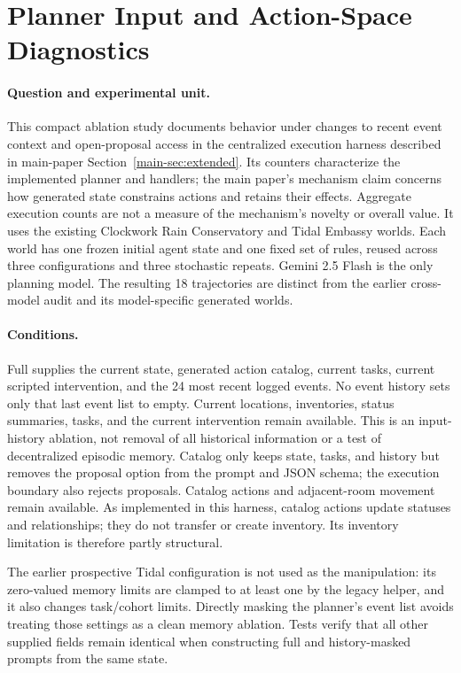 \section{Planner Input and Action-Space Diagnostics}
\label{app:ablation}

\paragraph{Question and experimental unit.}
This compact ablation study documents behavior under changes to recent event
context and open-proposal access in the centralized execution harness described
in main-paper Section~\ref{main-sec:extended}. Its counters characterize the
implemented planner and handlers; the main paper's mechanism claim concerns
how generated state constrains actions and retains their effects. Aggregate
execution counts are not a measure of the mechanism's novelty or overall value. It uses the existing Clockwork Rain
Conservatory and Tidal Embassy worlds. Each world has one frozen initial agent
state and one fixed set of rules, reused across three configurations and three
stochastic repeats. Gemini 2.5 Flash is the only planning model. The resulting
18 trajectories are distinct from the earlier cross-model audit and its
model-specific generated worlds.

\paragraph{Conditions.}
Full supplies the current state, generated action catalog, current tasks,
current scripted intervention, and the 24 most recent logged events.
No event history sets only that last event list to empty. Current locations,
inventories, status summaries, tasks, and the current intervention remain
available. This is an input-history ablation, not removal of all historical
information or a test of decentralized episodic memory. Catalog only keeps
state, tasks, and history but removes the proposal option from the prompt and
JSON schema; the execution boundary also rejects proposals. Catalog actions
and adjacent-room movement remain available. As implemented in this harness,
catalog actions update statuses and relationships; they do not transfer or
create inventory. Its inventory limitation is therefore partly structural.

The earlier prospective Tidal configuration is not used as the manipulation:
its zero-valued memory limits are clamped to at least one by the legacy helper,
and it also changes task/cohort limits. Directly masking the planner's event
list avoids treating those settings as a clean memory ablation. Tests verify
that all other supplied fields remain identical when constructing full and
history-masked prompts from the same state.

